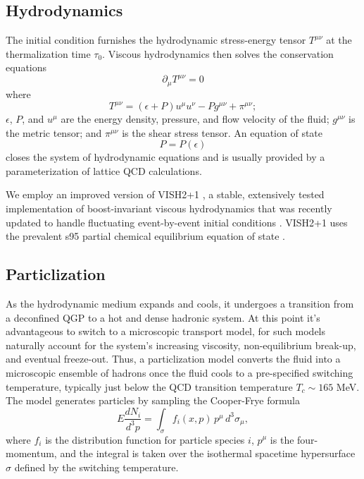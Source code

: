 \documentclass[aps,prc,reprint,superscriptaddress,amsmath]{revtex4-1}
\begin{document}
\subsection{Hydrodynamics}

The initial condition furnishes the hydrodynamic stress-energy tensor $T^{\mu\nu}$ at the thermalization time $\tau_0$.
Viscous hydrodynamics then solves the conservation equations
\begin{equation}
  \partial_\mu T^{\mu\nu} = 0
\end{equation}
where
\begin{equation}
  T^{\mu\nu} = (\epsilon + P) u^\mu u^\nu - P g^{\mu\nu} + \pi^{\mu\nu};
\end{equation}
$\epsilon$, $P$, and $u^\mu$ are the energy density, pressure, and flow velocity of the fluid; $g^{\mu\nu}$ is the metric tensor; and $\pi^{\mu\nu}$ is the shear stress tensor.
An equation of state
\begin{equation}
  P = P(\epsilon)
\end{equation}
closes the system of hydrodynamic equations and is usually provided by a parameterization of lattice QCD calculations.

We employ an improved version of VISH2+1 \cite{Song:2007ux}, a stable, extensively tested implementation of boost-invariant viscous hydrodynamics that was recently updated to handle fluctuating event-by-event initial conditions \cite{Shen:2014vra}.
VISH2+1 uses the prevalent s95 partial chemical equilibrium equation of state \cite{Huovinen:2009yb}.

\subsection{Particlization}

As the hydrodynamic medium expands and cools, it undergoes a transition from a deconfined QGP to a hot and dense hadronic system.
At this point it's advantageous to switch to a microscopic transport model, for such models naturally account for the system's increasing viscosity, non-equilibrium break-up, and eventual freeze-out.
Thus, a particlization model converts the fluid into a microscopic ensemble of hadrons once the fluid cools to a pre-specified switching temperature, typically just below the QCD transition temperature $T_c \sim 165$ MeV.
The model generates particles by sampling the Cooper-Frye formula \cite{Cooper:1974mv}
\begin{equation}
  E \frac{dN_i}{d^3p} = \int_\sigma f_i(x,p) \, p^\mu \, d^3\sigma_\mu,
\end{equation}
where $f_i$ is the distribution function for particle species $i$, $p^\mu$ is the four-momentum, and the integral is taken over the isothermal spacetime hypersurface $\sigma$ defined by the switching temperature.
\end{document}
